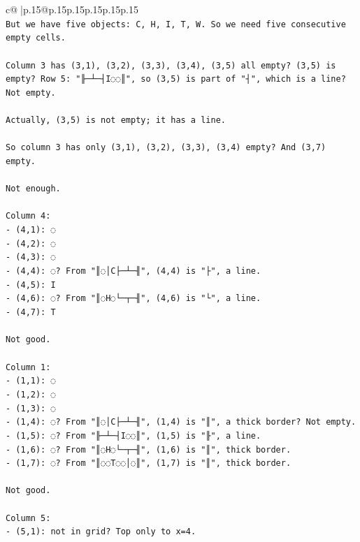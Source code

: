 \documentclass{article}
\begin{document}
{\begin{supertabular}{c@{$\;$}|p{.15\linewidth}@{}p{.15\linewidth}p{.15\linewidth}p{.15\linewidth}p{.15\linewidth}p{.15\linewidth}}
{{{\\ 
\texttt{But we have five objects: C, H, I, T, W. So we need five consecutive empty cells.} \\
\\ 
\texttt{Column 3 has (3,1), (3,2), (3,3), (3,4), (3,5) all empty? (3,5) is empty? Row 5: "╟─┴─┤I◌◌║", so (3,5) is part of "┤", which is a line? Not empty.} \\
\\ 
\texttt{Actually, (3,5) is not empty; it has a line.} \\
\\ 
\texttt{So column 3 has only (3,1), (3,2), (3,3), (3,4) empty? And (3,7) empty.} \\
\\ 
\texttt{Not enough.} \\
\\ 
\texttt{Column 4:} \\
\texttt{{-} (4,1): ◌} \\
\texttt{{-} (4,2): ◌} \\
\texttt{{-} (4,3): ◌} \\
\texttt{{-} (4,4): ◌? From "║◌│C├─┴─╢", (4,4) is "├", a line.} \\
\texttt{{-} (4,5): I} \\
\texttt{{-} (4,6): ◌? From "║◌H◌└─┬─╢", (4,6) is "└", a line.} \\
\texttt{{-} (4,7): T} \\
\\ 
\texttt{Not good.} \\
\\ 
\texttt{Column 1:} \\
\texttt{{-} (1,1): ◌} \\
\texttt{{-} (1,2): ◌} \\
\texttt{{-} (1,3): ◌} \\
\texttt{{-} (1,4): ◌? From "║◌│C├─┴─╢", (1,4) is "║", a thick border? Not empty.} \\
\texttt{{-} (1,5): ◌? From "╟─┴─┤I◌◌║", (1,5) is "╟", a line.} \\
\texttt{{-} (1,6): ◌? From "║◌H◌└─┬─╢", (1,6) is "║", thick border.} \\
\texttt{{-} (1,7): ◌? From "║◌◌T◌◌│◌║", (1,7) is "║", thick border.} \\
\\ 
\texttt{Not good.} \\
\\ 
\texttt{Column 5:} \\
\texttt{{-} (5,1): not in grid? Top only to x=4.} \\
}}}
\end{supertabular}}
\end{document}
